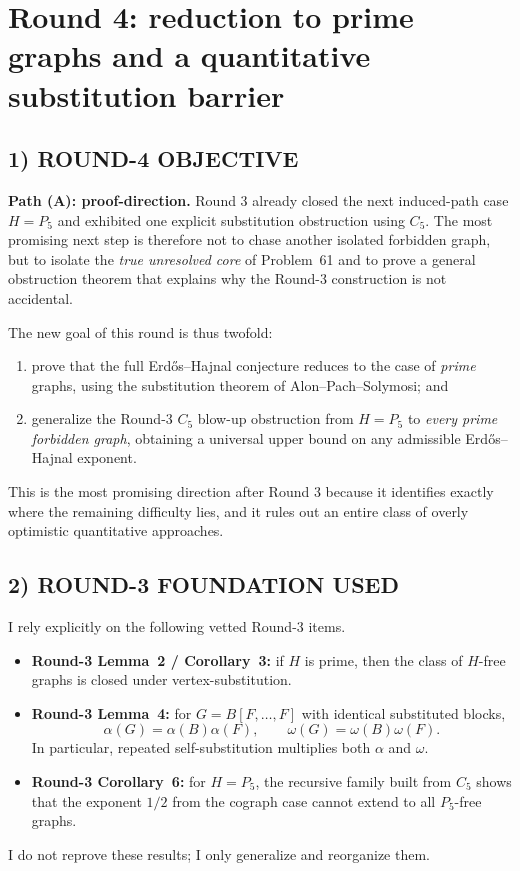 \section{Round 4: reduction to prime graphs and a quantitative substitution barrier}

\subsection*{1) ROUND-4 OBJECTIVE}
\textbf{Path (A): proof-direction.}  Round 3 already closed the next induced-path case $H=P_5$ and exhibited one explicit substitution obstruction using $C_5$.
The most promising next step is therefore not to chase another isolated forbidden graph, but to isolate the \emph{true unresolved core} of Problem~61 and to prove a general obstruction theorem that explains why the Round-3 construction is not accidental.

The new goal of this round is thus twofold:
\begin{enumerate}
\item prove that the full Erd\H{o}s--Hajnal conjecture reduces to the case of \emph{prime} graphs, using the substitution theorem of Alon--Pach--Solymosi; and
\item generalize the Round-3 $C_5$ blow-up obstruction from $H=P_5$ to \emph{every prime forbidden graph}, obtaining a universal upper bound on any admissible Erd\H{o}s--Hajnal exponent.
\end{enumerate}

This is the most promising direction after Round 3 because it identifies exactly where the remaining difficulty lies, and it rules out an entire class of overly optimistic quantitative approaches.

\subsection*{2) ROUND-3 FOUNDATION USED}
I rely explicitly on the following vetted Round-3 items.
\begin{itemize}
\item \textbf{Round-3 Lemma~2 / Corollary~3:} if $H$ is prime, then the class of $H$-free graphs is closed under vertex-substitution.
\item \textbf{Round-3 Lemma~4:} for $G=B[F,\dots,F]$ with identical substituted blocks,
\[
\alpha(G)=\alpha(B)\alpha(F),\qquad \omega(G)=\omega(B)\omega(F).
\]
In particular, repeated self-substitution multiplies both $\alpha$ and $\omega$.
\item \textbf{Round-3 Corollary~6:} for $H=P_5$, the recursive family built from $C_5$ shows that the exponent $1/2$ from the cograph case cannot extend to all $P_5$-free graphs.
\end{itemize}
I do not reprove these results; I only generalize and reorganize them.

